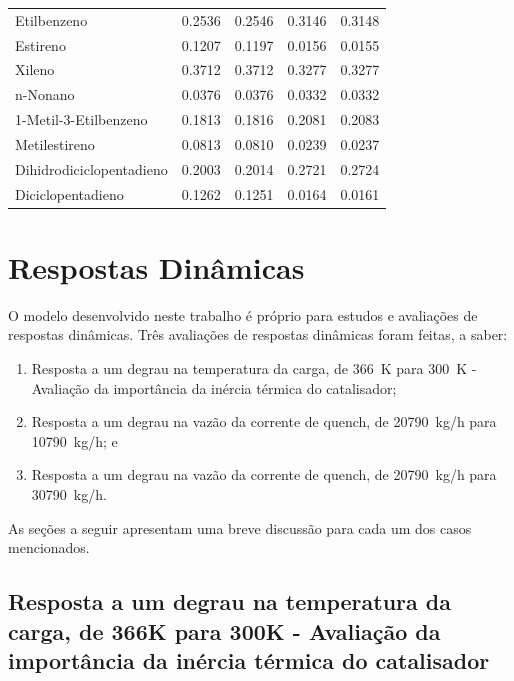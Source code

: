 \begin{table}[!htb]
\begin{center}
\begin{tabular}{lcccc}
{Etilbenzeno} & \num{0,2536} & \num{0,2546} & \num{0,3146} & \num{0,3148} \\
{Estireno} & \num{0,1207} & \num{0,1197} & \num{0,0156} & \num{0,0155} \\
{Xileno} & \num{0,3712} & \num{0,3712} & \num{0,3277} & \num{0,3277} \\
{n-Nonano} & \num{0,0376} & \num{0,0376} & \num{0,0332} & \num{0,0332} \\
{1-Metil-3-Etilbenzeno} & \num{0,1813} & \num{0,1816} & \num{0,2081} &
\num{0,2083}
\\
{Metilestireno} & \num{0,0813} & \num{0,0810} & \num{0,0239} & \num{0,0237} \\
{Dihidrodiciclopentadieno} & \num{0,2003} & \num{0,2014} & \num{0,2721} &
\num{0,2724} \\
{Diciclopentadieno} & \num{0,1262} & \num{0,1251} & \num{0,0164} & \num{0,0161}
\\
\bottomrule
\end{tabular}
\end{center}
\end{table}

\section{Respostas Dinâmicas} \label{sec:respostasdinamicas}

O modelo desenvolvido neste trabalho é próprio para estudos e
avaliações de respostas dinâmicas. Três avaliações de respostas dinâmicas foram
feitas, a saber:

\begin{enumerate}
  \item Resposta a   um degrau na temperatura da carga, de \SI{366}{K} para
  \SI{300}{K} - Avaliação da importância da inércia térmica do catalisador;
  \item Resposta a um degrau na vazão da corrente de quench, de \SI{20790}{kg/h}
  para \SI{10790}{kg/h}; e
  \item Resposta a um degrau na vazão da corrente de quench, de \SI{20790}{kg/h}
  para \SI{30790}{kg/h}.
\end{enumerate}

As seções a seguir apresentam uma breve discussão para cada um dos casos
mencionados.

\subsection{Resposta a   um degrau na temperatura da carga, de \si{366}{K} para
\si{300}{K} - Avaliação da importância da inércia térmica do catalisador}
\label{sec:respostaaumdegrautemp}

